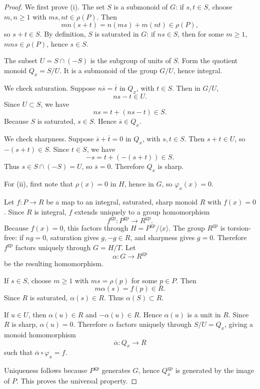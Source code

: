 \documentclass[12pt]{article}
\theoremstyle{definition}
\theoremstyle{remark}
\numberwithin{equation}{section}
\newcommand{\gp}{\mathrm{gp}}
\begin{document}
\begin{proof}
We first prove (i).  The set \(S\) is a submonoid of \(G\): if \(s,t\in S\), choose \(m,n\geq 1\) with \(ms,nt\in \rho(P)\).  Then
\[
mn(s+t)=n(ms)+m(nt)\in \rho(P),
\]
so \(s+t\in S\).  By definition, \(S\) is saturated in \(G\): if \(ns\in S\), then for some \(m\geq 1\), \(mns\in \rho(P)\), hence \(s\in S\).

The subset \(U=S\cap(-S)\) is the subgroup of units of \(S\).  Form the quotient monoid \(Q_x=S/U\).  It is a submonoid of the group \(G/U\), hence integral.

We check saturation.  Suppose \(n\overline{s}=\overline{t}\) in \(Q_x\), with \(t\in S\).  Then in \(G/U\),
\[
ns-t\in U.
\]
Since \(U\subset S\), we have
\[
ns=t+(ns-t)\in S.
\]
Because \(S\) is saturated, \(s\in S\).  Hence \(\overline{s}\in Q_x\).

We check sharpness.  Suppose \(\overline{s}+\overline{t}=0\) in \(Q_x\), with \(s,t\in S\).  Then \(s+t\in U\), so \(-(s+t)\in S\).  Since \(t\in S\), we have
\[
-s=t+(-(s+t))\in S.
\]
Thus \(s\in S\cap(-S)=U\), so \(\overline{s}=0\).  Therefore \(Q_x\) is sharp.

For (ii), first note that \(\rho(x)=0\) in \(H\), hence in \(G\), so \(\varphi_x(x)=0\).

Let \(f:P\to R\) be a map to an integral, saturated, sharp monoid \(R\) with \(f(x)=0\).  Since \(R\) is integral, \(f\) extends uniquely to a group homomorphism
\[
f^{\gp}:P^{\gp}\longrightarrow R^{\gp}.
\]
Because \(f(x)=0\), this factors through \(H=P^{\gp}/\langle x\rangle\).  The group \(R^{\gp}\) is torsion-free: if \(ng=0\), saturation gives \(g,-g\in R\), and sharpness gives \(g=0\).  Therefore \(f^{\gp}\) factors uniquely through \(G=H/T\).  Let
\[
\alpha:G\longrightarrow R^{\gp}
\]
be the resulting homomorphism.

If \(s\in S\), choose \(m\geq 1\) with \(ms=\rho(p)\) for some \(p\in P\).  Then
\[
m\alpha(s)=f(p)\in R.
\]
Since \(R\) is saturated, \(\alpha(s)\in R\).  Thus \(\alpha(S)\subset R\).

If \(u\in U\), then \(\alpha(u)\in R\) and \(-\alpha(u)\in R\).  Hence \(\alpha(u)\) is a unit in \(R\).  Since \(R\) is sharp, \(\alpha(u)=0\).  Therefore \(\alpha\) factors uniquely through \(S/U=Q_x\), giving a monoid homomorphism
\[
\overline{\alpha}:Q_x\longrightarrow R
\]
such that \(\overline{\alpha}\circ\varphi_x=f\).

Uniqueness follows because \(P^{\gp}\) generates \(G\), hence \(Q_x^{\gp}\) is generated by the image of \(P\).  This proves the universal property.


\end{proof}
\end{document}
